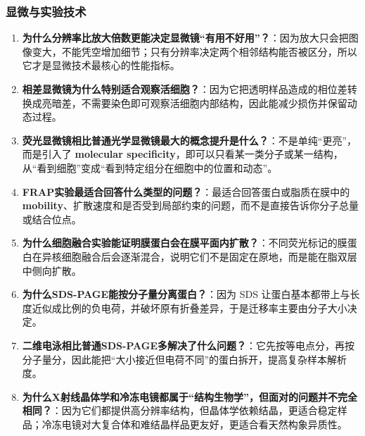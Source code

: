 \documentclass[12pt,fontset=none]{ctexart}
\begin{document}
\subsubsection*{显微与实验技术}
\begin{enumerate}
\item \textbf{为什么分辨率比放大倍数更能决定显微镜“有用不好用”？}：因为放大只会把图像变大，不能凭空增加细节；只有分辨率决定两个相邻结构能否被区分，所以它才是显微技术最核心的性能指标。

\item \textbf{相差显微镜为什么特别适合观察活细胞？}：因为它把透明样品造成的相位差转换成亮暗差，不需要染色即可观察活细胞内部结构，因此能减少损伤并保留动态过程。

\item \textbf{荧光显微镜相比普通光学显微镜最大的概念提升是什么？}：不是单纯“更亮”，而是引入了 \textbf{molecular specificity}，即可以只看某一类分子或某一结构，从“看到细胞”变成“看到特定组分在细胞中的位置和动态”。

\item \textbf{FRAP实验最适合回答什么类型的问题？}：最适合回答蛋白或脂质在膜中的 \textbf{mobility}、扩散速度和是否受到局部约束的问题，而不是直接告诉你分子总量或结合位点。

\item \textbf{为什么细胞融合实验能证明膜蛋白会在膜平面内扩散？}：不同荧光标记的膜蛋白在异核细胞融合后会逐渐混合，说明它们不是固定在原地，而是能在脂双层中侧向扩散。

\item \textbf{为什么SDS-PAGE能按分子量分离蛋白？}：因为 SDS 让蛋白基本都带上与长度近似成比例的负电荷，并破坏原有折叠差异，于是迁移率主要由分子大小决定。

\item \textbf{二维电泳相比普通SDS-PAGE多解决了什么问题？}：它先按等电点分，再按分子量分，因此能把“大小接近但电荷不同”的蛋白拆开，提高复杂样本解析度。

\item \textbf{为什么X射线晶体学和冷冻电镜都属于“结构生物学”，但面对的问题并不完全相同？}：因为它们都提供高分辨率结构，但晶体学依赖结晶，更适合稳定样品；冷冻电镜对大复合体和难结晶样品更友好，更适合看天然构象异质性。

\end{enumerate}
\end{document}
